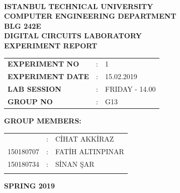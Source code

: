 \documentclass[pdftex,12pt,a4paper]{article}
\begin{document}
\begin{titlepage}
\begin{center}
\textbf{}\\
\textbf{\Large{ISTANBUL TECHNICAL UNIVERSITY}}\\
\vspace{0.5cm}
\textbf{\Large{COMPUTER ENGINEERING DEPARTMENT}}\\
\vspace{2cm}
\textbf{\Large{BLG 242E\\ DIGITAL CIRCUITS LABORATORY\\ EXPERIMENT REPORT}}\\
\vspace{2.8cm}
\begin{table}[ht]
\centering
\Large{
\begin{tabular}{lcl}
\textbf{EXPERIMENT NO}  & : & 1 \\
\textbf{EXPERIMENT DATE}  & : & 15.02.2019 \\
\textbf{LAB SESSION}  & : & FRIDAY - 14.00 \\
\textbf{GROUP NO}  & : & G13 \\
\end{tabular}}
\end{table}
\vspace{1cm}
\textbf{\Large{GROUP MEMBERS:}}\\
\begin{table}[ht]
\centering
\Large{
\begin{tabular}{rcl}
{
150180704  & : & C\.{I}HAT AKK\.{I}RAZ \\
150180707  & : & FAT\.{I}H ALTINPINAR \\
150180734  & : & S\.{I}NAN \c{S}AR \\
}
\end{tabular}}
\end{table}
\vspace{2.8cm}
\textbf{\Large{SPRING 2019}}

\end{center}

\end{titlepage}

\newpage
\newpage

\thispagestyle{empty}
\setcounter{tocdepth}{4}
\tableofcontents
\clearpage
\end{document}
